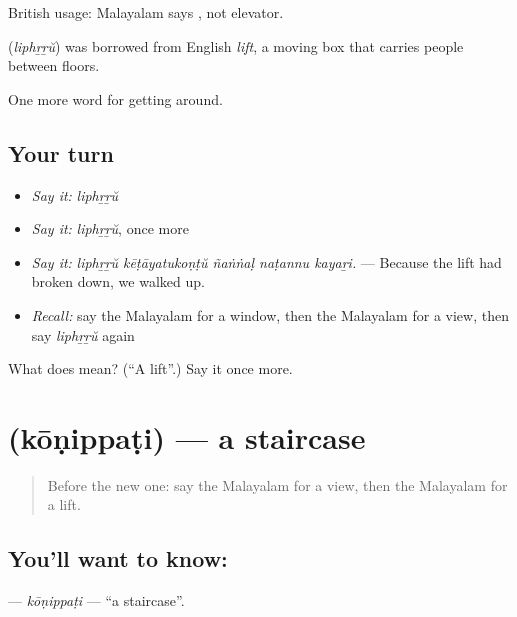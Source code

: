 British usage: Malayalam says , not elevator.

\begin{cousinweb}
\textbf{} (\emph{liphṟṟŭ}) was borrowed from English \emph{lift}, a moving box that carries people between floors.
\end{cousinweb}

\begin{grammarlens}[title={What you've built}]
One more word for getting around.
\end{grammarlens}

\subsection*{Your turn}
\begin{itemize}
\raggedright
  \item \emph{Say it:} \emph{liphṟṟŭ}
  \item \emph{Say it:} \emph{liphṟṟŭ}, once more
  \item \emph{Say it:} \emph{liphṟṟŭ kēṭāyatukoṇṭŭ ñaṅṅaḷ naṭannu kayaṟi.} — Because the lift had broken down, we walked up.
  \item \emph{Recall:} say the Malayalam for a window, then the Malayalam for a view, then say \emph{liphṟṟŭ} again
\end{itemize}

\begin{tcolorbox}[breakable,colback=teal!4,colframe=teal!35!black,title={Before you move on}]
What does  mean? (\textquotedblleft{}A lift\textquotedblright{}.) Say it once more.
\end{tcolorbox}
\section[\texorpdfstring{\ml{കോണിപ്പടി} (kōṇippaṭi)}{കോണിപ്പടി (kōṇippaṭi)}]{ (kōṇippaṭi) — a staircase}

\label{lesson:ML-C485-konippati}



\begin{quote}
Before the new one: say the Malayalam for a view, then the Malayalam for a lift.
\end{quote}

\subsection*{You'll want to know: }
\textbf{} — \emph{kōṇippaṭi} — \textquotedblleft{}a staircase\textquotedblright{}.

